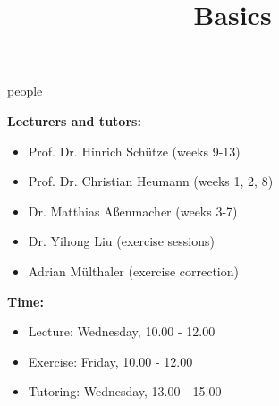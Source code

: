 


\newcommand*\POS[1]{\textsubscript{\texttt{#1}}} %
\usepackage{qtree} %

\newcommand{\learninggoals}{
\item Understand the scope of the course
\item Answers to all open question
\item Get an impression of the workload}

\title{Basics}
\date{}




\begin{vbframe}{people}

\vfill

\textbf{Lecturers and tutors:}

	\begin{itemize}
		\item Prof. Dr. Hinrich Schütze (weeks 9-13)
		\item Prof. Dr. Christian Heumann (weeks 1, 2, 8)
		\item Dr. Matthias Aßenmacher (weeks 3-7)
		\item Dr. Yihong Liu (exercise sessions)
		\item Adrian Mülthaler (exercise correction)
	\end{itemize}

\textbf{Time:}

	\begin{itemize}
		\item Lecture: Wednesday, 10.00 - 12.00
		\item Exercise: Friday, 10.00 - 12.00
		\item Tutoring: Wednesday, 13.00 - 15.00
	\end{itemize}

\vfill

\end{vbframe}



